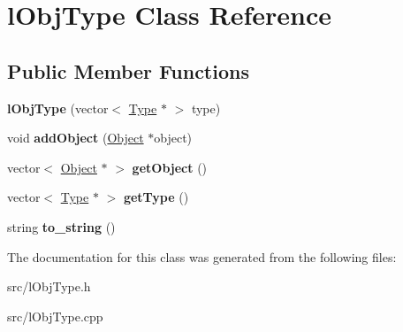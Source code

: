 \hypertarget{classlObjType}{\section{l\+Obj\+Type Class Reference}
\label{classlObjType}
}
\subsection*{Public Member Functions}
\begin{DoxyCompactItemize}
\item 
\hypertarget{classlObjType_ac8f04721671b99941bc9f5d01cfa0bf2}{{\bfseries l\+Obj\+Type} (vector$<$ \hyperlink{classType}{Type} $\ast$ $>$ type)}\label{classlObjType_ac8f04721671b99941bc9f5d01cfa0bf2}

\item 
\hypertarget{classlObjType_a3e46aade4a142ec83d0c32fbf0976e69}{void {\bfseries add\+Object} (\hyperlink{classObject}{Object} $\ast$object)}\label{classlObjType_a3e46aade4a142ec83d0c32fbf0976e69}

\item 
\hypertarget{classlObjType_aab8e59f4a888f5c03b56e33f9f383463}{vector$<$ \hyperlink{classObject}{Object} $\ast$ $>$ {\bfseries get\+Object} ()}\label{classlObjType_aab8e59f4a888f5c03b56e33f9f383463}

\item 
\hypertarget{classlObjType_aa820d1b6209ceb3c9728bf1499e4a236}{vector$<$ \hyperlink{classType}{Type} $\ast$ $>$ {\bfseries get\+Type} ()}\label{classlObjType_aa820d1b6209ceb3c9728bf1499e4a236}

\item 
\hypertarget{classlObjType_a6dc50601c26c5dbf6af5f01cd7adf9e2}{string {\bfseries to\+\_\+string} ()}\label{classlObjType_a6dc50601c26c5dbf6af5f01cd7adf9e2}

\end{DoxyCompactItemize}


The documentation for this class was generated from the following files\+:\begin{DoxyCompactItemize}
\item 
src/l\+Obj\+Type.\+h\item 
src/l\+Obj\+Type.\+cpp\end{DoxyCompactItemize}
